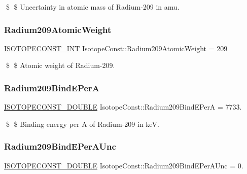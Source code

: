 \$ \$ Uncertainty in atomic mass of Radium-\/209 in amu. \mbox{\label{group___isotope_const-_radium-_ra209_ga404ee466e5334bb6acae900d28dcfea5}} 
\subsubsection{\texorpdfstring{Radium209\+Atomic\+Weight}{Radium209AtomicWeight}}
{\footnotesize\ttfamily \mbox{\hyperlink{group___isotope_const-_macros_ga5f18360b3e99483a35c32d789e62621c}{I\+S\+O\+T\+O\+P\+E\+C\+O\+N\+S\+T\+\_\+\+I\+NT}} Isotope\+Const\+::\+Radium209\+Atomic\+Weight = 209}

\$ \$ Atomic weight of Radium-\/209. \mbox{\label{group___isotope_const-_radium-_ra209_ga37534bdc044a00822b358148c4a08364}} 
\subsubsection{\texorpdfstring{Radium209\+Bind\+E\+PerA}{Radium209BindEPerA}}
{\footnotesize\ttfamily \mbox{\hyperlink{group___isotope_const-_macros_ga8f45a7272ce02c0b4c65c44636ed719a}{I\+S\+O\+T\+O\+P\+E\+C\+O\+N\+S\+T\+\_\+\+D\+O\+U\+B\+LE}} Isotope\+Const\+::\+Radium209\+Bind\+E\+PerA = 7733.}

\$ \$ Binding energy per A of Radium-\/209 in keV. \mbox{\label{group___isotope_const-_radium-_ra209_ga79035b80c0bd79f91c47680e1930d6ab}} 
\subsubsection{\texorpdfstring{Radium209\+Bind\+E\+Per\+A\+Unc}{Radium209BindEPerAUnc}}
{\footnotesize\ttfamily \mbox{\hyperlink{group___isotope_const-_macros_ga8f45a7272ce02c0b4c65c44636ed719a}{I\+S\+O\+T\+O\+P\+E\+C\+O\+N\+S\+T\+\_\+\+D\+O\+U\+B\+LE}} Isotope\+Const\+::\+Radium209\+Bind\+E\+Per\+A\+Unc = 0.}

